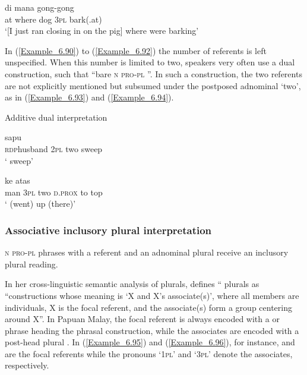 \ea
\label{Example_6.92}
\gll {\ldots} {di} {mana} {} {} {gong-gong}\\ %
 { }   at  where  dog  \textsc{3pl}  bark(.at)\\

\glt
‘[I just ran closing in on the pig] where  were barking’ \textstyleExampleSource{[080919-003-NP.0007]}
\z


In (\ref{Example_6.90}) to (\ref{Example_6.92}) the number of referents is left unspecified. When this number is limited to two, speakers very often use a dual construction, such that ``bare \textsc{n} \textsc{pro-pl} ''. In such a construction, the two referents are not explicitly mentioned but subsumed under the postposed adnominal   ‘two’, as in (\ref{Example_6.93}) and (\ref{Example_6.94}).



\begin{styleExampleTitle}
Additive dual interpretation
\end{styleExampleTitle}

\ea
\label{Example_6.93}
 {} {} {sapu}\\ %
 \textsc{rdp}{\Tilde}husband  \textsc{2pl}  two  sweep\\

\glt
‘ sweep’ \textstyleExampleSource{[081115-001b-Cv.0010]}
\z

\ea
\label{Example_6.94}
 {} {} {} {ke} {atas}\\ %
 man  \textsc{3pl}  two  \textsc{d.prox}  to  top\\
\glt
‘ (went) up (there)’ \textstyleExampleSource{[081006-034-CvEx.0010]}
\z


\subsubsection[Associative {inclusory plural interpretation}]{Associative inclusory plural interpretation}
\label{Para_6.2.2.2}
\textsc{n} \textsc{pro-pl}  phrases with a  referent and an adnominal plural  receive an  inclusory plural reading. 



In her cross-linguistic semantic analysis of  plurals, \citet[470–471]{Moravcsik.2003} defines “ plurals as “constructions whose meaning is ‘X and X’s associate(s)’, where all members are individuals, X is the focal referent, and the associate(s) form a group centering around X”. In Papuan Malay, the focal referent is always encoded with a  or  phrase heading the phrasal construction, while the associates are encoded with a post-head plural . In (\ref{Example_6.95}) and (\ref{Example_6.96}), for instance,  and  are the focal referents while the pronouns  ‘\textsc{1pl}’ and  ‘\textsc{3pl}’ denote the associates, respectively.



